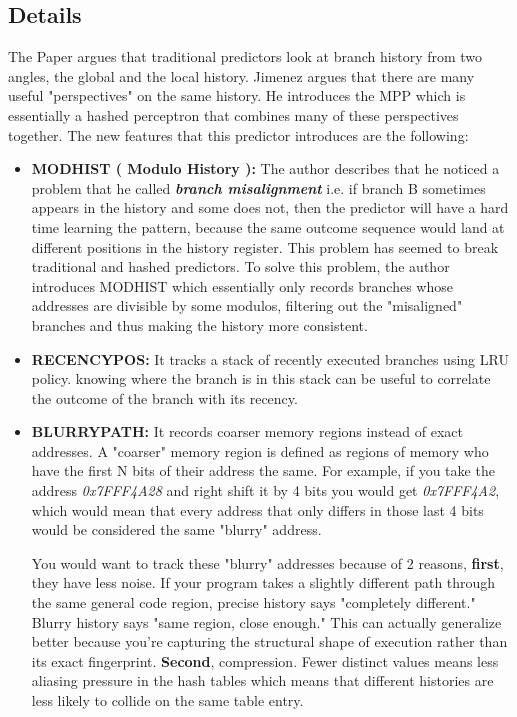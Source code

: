 \documentclass[11pt,a4paper]{article}
\begin{document}
\subsection{Details}
The Paper argues that traditional predictors look at branch history from two angles, the global and the local history. Jimenez argues that there are many useful "perspectives" on the same history. He introduces
the MPP which is essentially a hashed perceptron that combines many of these perspectives together. 
The new features that this predictor introduces are the following:
\begin{itemize}
        \item \textbf{MODHIST ( Modulo History ): }The author describes that he noticed a problem that he called \textit{\textbf{branch misalignment}} i.e. if branch B sometimes 
        appears in the history and some does not, then the predictor will have a hard time learning the pattern, because the same outcome sequence would land at different
        positions in the history register. This problem has seemed to break traditional and hashed predictors.
        To solve this problem, the author introduces MODHIST which essentially only records branches whose addresses are divisible by some modulos, filtering out the "misaligned" branches and thus making the history more consistent.
        \item \textbf{RECENCYPOS: }It tracks a stack of recently executed branches using LRU policy. knowing where the branch is in this stack can be useful to correlate the outcome of the branch with its recency.
        \item \textbf{BLURRYPATH: }It records coarser memory regions instead of exact addresses. A "coarser" memory region is defined as regions of memory who have the first N bits of their address the same.
        For example, if you take the address \textit{0x7FFF4A28} and right shift it by 4 bits you would get \textit{0x7FFF4A2}, which would mean that every address that only differs in those last 4 bits would be
        considered the same "blurry" address. 
        
        You would want to track these "blurry" addresses because of 2 reasons, \textbf{first}, they have less noise. If your program takes a slightly different path through the same general 
        code region, precise history says "completely different." Blurry history says "same region, close enough." This can actually generalize better because you're capturing the structural shape of execution rather 
        than its exact fingerprint. \textbf{Second}, compression. Fewer distinct values means less aliasing pressure in the hash tables which means that different histories are less likely to collide on the same table entry.


\end{itemize}
\end{document}
